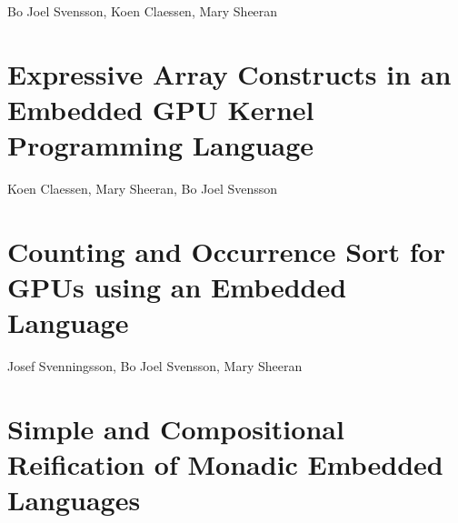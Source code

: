 \documentclass[a4paper]{book}
\begin{document}
\begin{center} 
Bo Joel Svensson, Koen Claessen, Mary Sheeran
\end{center}




% 
\cleardoublepage 

\section{Expressive Array Constructs in an Embedded GPU Kernel Programming Language}
\label{sec:paper3}

\begin{center} 
Koen Claessen, Mary Sheeran, Bo Joel Svensson
\end{center}



% 
\cleardoublepage 

\section{Counting and Occurrence Sort for GPUs using an Embedded Language}
\label{sec:paper4}

\begin{center} 
Josef Svenningsson, Bo Joel Svensson, Mary Sheeran 
\end{center}




% 
\cleardoublepage 


\section{Simple and Compositional Reification of Monadic Embedded Languages}
\label{sec:paper5}
\end{document}
